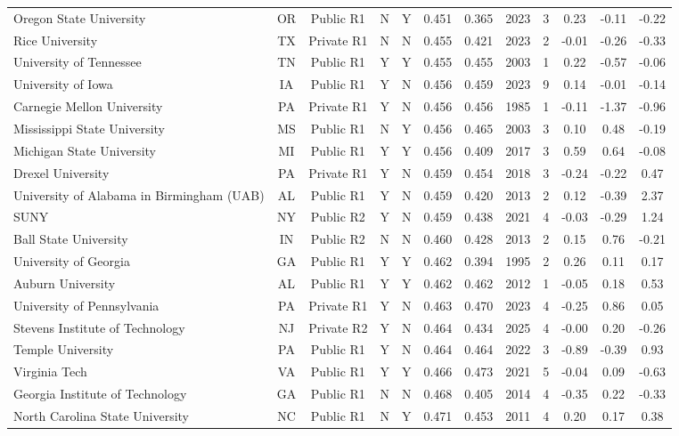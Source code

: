 \begin{longtable}{@{}p{3.55cm}ccccccccccc@{}}
Oregon State University & OR & Public R1 & N & Y & 0.451 & 0.365 & 2023 & 3 & 0.23 & -0.11 & -0.22 \\
Rice University & TX & Private R1 & N & N & 0.455 & 0.421 & 2023 & 2 & -0.01 & -0.26 & -0.33 \\
University of Tennessee & TN & Public R1 & Y & Y & 0.455 & 0.455 & 2003 & 1 & 0.22 & -0.57 & -0.06 \\
University of Iowa & IA & Public R1 & Y & N & 0.456 & 0.459 & 2023 & 9 & 0.14 & -0.01 & -0.14 \\
Carnegie Mellon University & PA & Private R1 & Y & N & 0.456 & 0.456 & 1985 & 1 & -0.11 & -1.37 & -0.96 \\
Mississippi State University & MS & Public R1 & N & Y & 0.456 & 0.465 & 2003 & 3 & 0.10 & 0.48 & -0.19 \\
Michigan State University & MI & Public R1 & Y & Y & 0.456 & 0.409 & 2017 & 3 & 0.59 & 0.64 & -0.08 \\
Drexel University & PA & Private R1 & Y & N & 0.459 & 0.454 & 2018 & 3 & -0.24 & -0.22 & 0.47 \\
University of Alabama in Birmingham (UAB) & AL & Public R1 & Y & N & 0.459 & 0.420 & 2013 & 2 & 0.12 & -0.39 & 2.37 \\
SUNY & NY & Public R2 & Y & N & 0.459 & 0.438 & 2021 & 4 & -0.03 & -0.29 & 1.24 \\
Ball State University & IN & Public R2 & N & N & 0.460 & 0.428 & 2013 & 2 & 0.15 & 0.76 & -0.21 \\
University of Georgia & GA & Public R1 & Y & Y & 0.462 & 0.394 & 1995 & 2 & 0.26 & 0.11 & 0.17 \\
Auburn University & AL & Public R1 & Y & Y & 0.462 & 0.462 & 2012 & 1 & -0.05 & 0.18 & 0.53 \\
University of Pennsylvania & PA & Private R1 & Y & N & 0.463 & 0.470 & 2023 & 4 & -0.25 & 0.86 & 0.05 \\
Stevens Institute of Technology & NJ & Private R2 & Y & N & 0.464 & 0.434 & 2025 & 4 & -0.00 & 0.20 & -0.26 \\
Temple University & PA & Public R1 & Y & N & 0.464 & 0.464 & 2022 & 3 & -0.89 & -0.39 & 0.93 \\
Virginia Tech & VA & Public R1 & Y & Y & 0.466 & 0.473 & 2021 & 5 & -0.04 & 0.09 & -0.63 \\
Georgia Institute of Technology & GA & Public R1 & N & N & 0.468 & 0.405 & 2014 & 4 & -0.35 & 0.22 & -0.33 \\
North Carolina State University & NC & Public R1 & N & Y & 0.471 & 0.453 & 2011 & 4 & 0.20 & 0.17 & 0.38 \\

\end{longtable}
